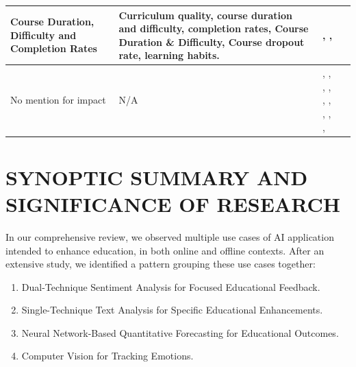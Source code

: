 \begin{table}
\begin{tabularx}{\textwidth}{|X|X|X|X|}
        \hline
        Course Duration, Difficulty and Completion Rates & Curriculum quality, course duration and difficulty, completion rates, Course Duration \& Difficulty, Course dropout rate, learning habits. & \cite{Competition_Neural_Network_Model_Application_in_the_Bilingual_Teaching_Quality_Evaluation_of_Universities}, \cite{Experience_in_learners_review_to_determine_attribute_relation_for_course_completion}, \cite{Exploring_Causes_for_the_Dropout_on_Massive_Open_Online_Courses} \\
        \hline
        No mention for impact  & N/A & \cite{Research_on_the_Application_of_BP_Neural_Network_in_Vocal_Music_Teaching_Quality_Evaluation}, \cite{Design_of_online_teaching_quality_evaluation_system_for_Private_University_Research_based_on_deep_learning_algorithm}, \cite{Sentiment_analysis_of_student_feedback_using_machine_learning_and_lexicon-based_approaches}, \cite{BP_Neural_Network-Based_Evaluation_on_University_Teachers'_Teaching_Quality}, \cite{Automatic_Rules_Generation_for_Teaching_Strategies_Improvement}, \cite{Evaluation_Model_of_PE_Teaching_Quality_Based_on_Active_Learning_Support_Vector_Machine}, \cite{Evaluation_System_of_Tourism_Psychology_Teaching_Quality_Based_on_Convolutional_Neural_Network}, \cite{An_Evaluation_Model_of_Moral_Education_Teaching_Quality_in_Universities_Based_on_System_Control_Theory}, \cite{Personalized_Learning_Model_based_on_Deep_Learning_Algorithm_for_Student_Behaviour_Analytic}, \cite{The_Evaluation_and_Application_of_BP_Neural_Network_in_the_Multiple_Quality_Assurance_Paths_of_Higher_Education} \\
        \hline
    \end{tabularx}
\end{table}

\section{SYNOPTIC SUMMARY AND SIGNIFICANCE OF RESEARCH}
\label{SYNOPTIC SUMMARY AND SIGNIFICANCE OF RESEARCH}
In our comprehensive review, we observed multiple use cases of AI application intended to enhance education, in both online and offline contexts. After an extensive study, we identified a pattern grouping these use cases together:

\begin{enumerate}
  \item Dual-Technique Sentiment Analysis for Focused Educational Feedback.
  \item Single-Technique Text Analysis for Specific Educational Enhancements.
  \item Neural Network-Based Quantitative Forecasting for Educational Outcomes.
  \item Computer Vision for Tracking Emotions.
\end{enumerate}

